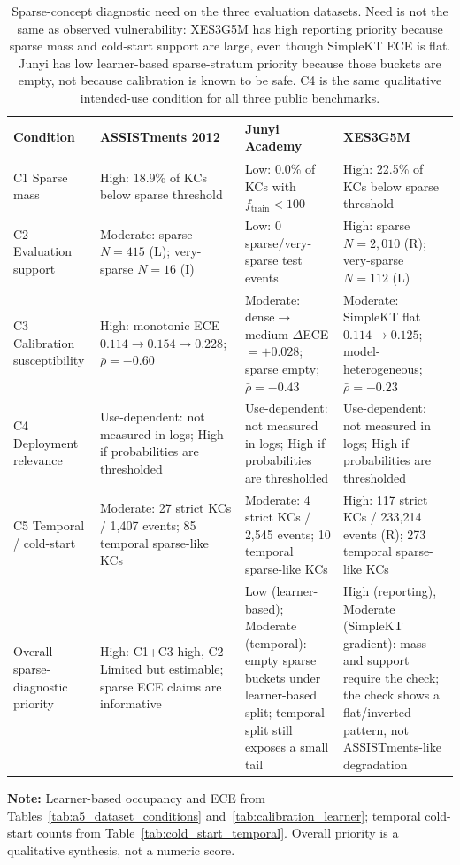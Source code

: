 \begin{table}[htbp]
\caption{Sparse-concept diagnostic need on the three evaluation datasets. Need is not the same as observed vulnerability: XES3G5M has high reporting priority because sparse mass and cold-start support are large, even though SimpleKT ECE is flat. Junyi has low learner-based sparse-stratum priority because those buckets are empty, not because calibration is known to be safe. C4 is the same qualitative intended-use condition for all three public benchmarks.}
\label{tab:a8_dataset_need}
\centering
\footnotesize
\setlength{\tabcolsep}{3.5pt}
\begin{tabularx}{\textwidth}{>{\raggedright\arraybackslash}p{2.8cm}XXX}
\toprule
\textbf{Condition} & \textbf{ASSISTments 2012} & \textbf{Junyi Academy} & \textbf{XES3G5M} \\
\midrule
C1 Sparse mass & High: 18.9\% of KCs below sparse threshold & Low: 0.0\% of KCs with $f_{\mathrm{train}}<100$ & High: 22.5\% of KCs below sparse threshold \\
\midrule
C2 Evaluation support & Moderate: sparse $N=415$ (L); very-sparse $N=16$ (I) & Low: 0 sparse/very-sparse test events & High: sparse $N=2{,}010$ (R); very-sparse $N=112$ (L) \\
\midrule
C3 Calibration susceptibility & High: monotonic ECE $0.114\to0.154\to0.228$; $\bar\rho=-0.60$ & Moderate: dense$\to$medium $\Delta$ECE$=+0.028$; sparse empty; $\bar\rho=-0.43$ & Moderate: SimpleKT flat $0.114\to0.125$; model-heterogeneous; $\bar\rho=-0.23$ \\
\midrule
C4 Deployment relevance & Use-dependent: not measured in logs; High if probabilities are thresholded & Use-dependent: not measured in logs; High if probabilities are thresholded & Use-dependent: not measured in logs; High if probabilities are thresholded \\
\midrule
C5 Temporal / cold-start & Moderate: 27 strict KCs / 1,407 events; 85 temporal sparse-like KCs & Moderate: 4 strict KCs / 2,545 events; 10 temporal sparse-like KCs & High: 117 strict KCs / 233,214 events (R); 273 temporal sparse-like KCs \\
\midrule
Overall sparse-diagnostic priority & High: C1+C3 high, C2 Limited but estimable; sparse ECE claims are informative & Low (learner-based); Moderate (temporal): empty sparse buckets under learner-based split; temporal split still exposes a small tail & High (reporting), Moderate (SimpleKT gradient): mass and support require the check; the check shows a flat/inverted pattern, not ASSISTments-like degradation \\
\bottomrule
\end{tabularx}

\vspace{1ex}
{\scriptsize \textbf{Note:} Learner-based occupancy and ECE from Tables~\ref{tab:a5_dataset_conditions} and~\ref{tab:calibration_learner}; temporal cold-start counts from Table~\ref{tab:cold_start_temporal}. Overall priority is a qualitative synthesis, not a numeric score.\par}
\end{table}
